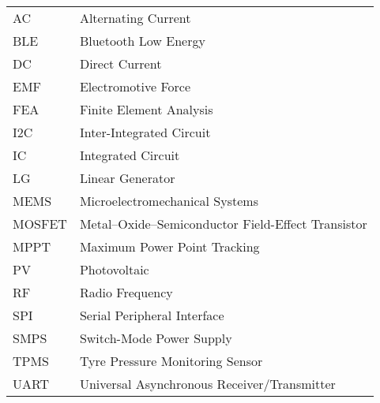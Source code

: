 \documentclass[english,12pt,a4paper,pdftex,elec,utf8]{aaltothesis}
\begin{document}
\begin{tabular}{ll}
AC         & Alternating Current \\
BLE        & Bluetooth Low Energy \\
DC         & Direct Current \\
EMF        & Electromotive Force \\
FEA        & Finite Element Analysis \\
I2C        & Inter-Integrated Circuit \\
IC         & Integrated Circuit \\
LG         & Linear Generator \\
MEMS       & Microelectromechanical Systems \\
MOSFET     & Metal–Oxide–Semiconductor Field-Effect Transistor \\
MPPT       & Maximum Power Point Tracking \\
PV         & Photovoltaic \\
RF         & Radio Frequency \\
SPI        & Serial Peripheral Interface \\
SMPS       & Switch-Mode Power Supply \\
TPMS       & Tyre Pressure Monitoring Sensor \\
UART       & Universal Asynchronous Receiver/Transmitter
\end{tabular}


\cleardoublepage
\storeinipagenumber
{}
\setcounter{page}{1}



\end{document}
